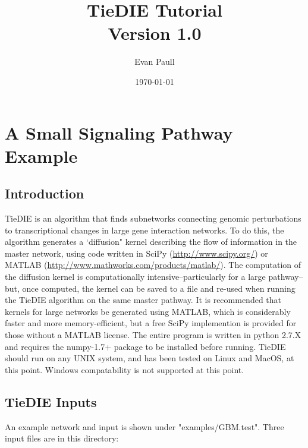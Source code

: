 \documentclass[11pt]{report}
\author{Evan Paull \emailaddr{epaull@soe.ucsc.edu}}
\title{TieDIE Tutorial \\ Version 1.0}
\date{\today}
\begin{document}
\maketitle

\tableofcontents

\singlespace

\chapter{A Small Signaling Pathway Example}

\section{Introduction}

\noindent TieDIE is an algorithm that finds subnetworks connecting genomic perturbations to transcriptional changes in 
large gene interaction networks. To do this, the algorithm generates a `diffusion" kernel describing
the flow of information in the master network, using code written in SciPy (\url{http://www.scipy.org/}) or 
 MATLAB (\url{http://www.mathworks.com/products/matlab/}). The computation of the diffusion kernel is computationally
intensive--particularly for a large pathway--but, once computed, the kernel can be saved to a file and re-used
when running the TieDIE algorithm on the same master pathway. It is recommended that kernels for large networks
be generated using MATLAB, which is considerably faster and more memory-efficient, but a free SciPy implemention is 
provided for those without a MATLAB license. The entire program is written in python 2.7.X and requires the numpy-1.7+
package to be installed before running. TieDIE should run on any UNIX system, and has been tested on Linux and MacOS, at this 
point. Windows compatability is not supported at this point. 

\section{TieDIE Inputs}

\noindent An example network and input is shown under "examples/GBM.test". Three input files are in this directory: 
\end{document}
